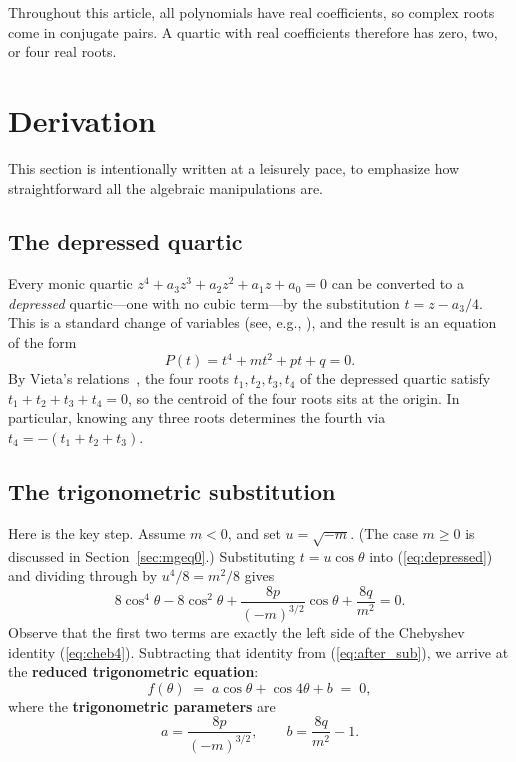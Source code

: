 \documentclass[12pt]{article}
\theoremstyle{definition}
\theoremstyle{remark}
\begin{document}
Throughout this article, all polynomials have real coefficients, so complex roots come in conjugate pairs. A quartic with real coefficients therefore has zero, two, or four real roots.

\section{Derivation}

This section is intentionally written at a leisurely pace, to emphasize how straightforward all the algebraic manipulations are.

\subsection{The depressed quartic}

Every monic quartic $z^4 + a_3 z^3 + a_2 z^2 + a_1 z + a_0 = 0$ can be converted to a \emph{depressed} quartic---one with no cubic term---by the substitution $t = z - a_3/4$. This is a standard change of variables (see, e.g., \cite{Irving2013}), and the result is an equation of the form
\begin{equation}\label{eq:depressed}
P(t) = t^4 + mt^2 + pt + q = 0.
\end{equation}
By Vieta's relations~\cite{Viete1646}, the four roots $t_1, t_2, t_3, t_4$ of the depressed quartic satisfy $t_1 + t_2 + t_3 + t_4 = 0$, so the centroid of the four roots sits at the origin. In particular, knowing any three roots determines the fourth via $t_4 = -(t_1 + t_2 + t_3)$.

\subsection{The trigonometric substitution}

Here is the key step. Assume $m < 0$, and set $u = \sqrt{-m}$. (The case $m \geq 0$ is discussed in Section~\ref{sec:mgeq0}.) Substituting $t = u\cos\theta$ into (\ref{eq:depressed}) and dividing through by $u^4/8 = m^2/8$ gives
\begin{equation}\label{eq:after_sub}
8\cos^4\theta - 8\cos^2\theta + \frac{8p}{(-m)^{3/2}}\cos\theta + \frac{8q}{m^2} = 0.
\end{equation}
Observe that the first two terms are exactly the left side of the Chebyshev identity (\ref{eq:cheb4}). Subtracting that identity from (\ref{eq:after_sub}), we arrive at the \textbf{reduced trigonometric equation}:
\begin{equation}\label{eq:f_def}
\boxed{f(\theta) \;=\; a\cos\theta + \cos 4\theta + b \;=\; 0,}
\end{equation}
where the \textbf{trigonometric parameters} are
\begin{equation}\label{eq:ab}
a = \frac{8p}{(-m)^{3/2}}, \qquad b = \frac{8q}{m^2} - 1.
\end{equation}
\end{document}
